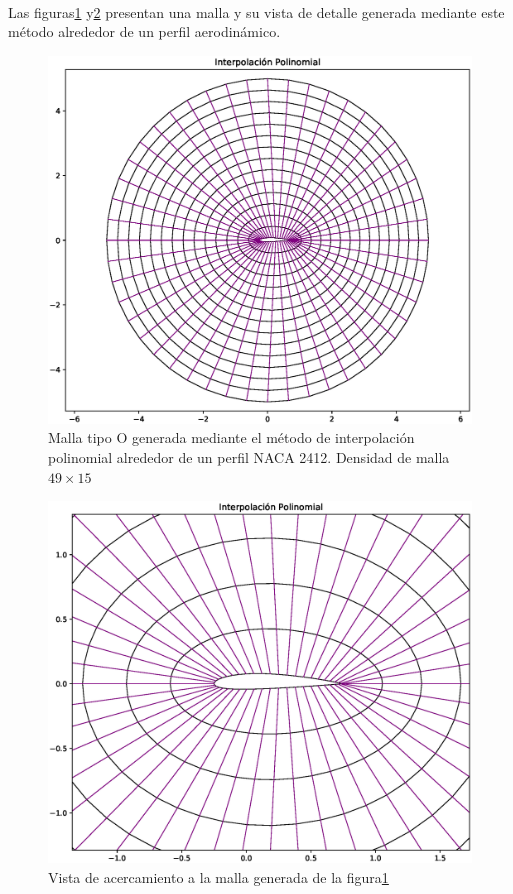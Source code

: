 \documentclass[letterpaper, openright, 12pt]{book}
\begin{document}
    \paragraph*{}
        Las figuras\ref{fig:malla-inter} y\ref{fig:malla-inter-cerca}
        presentan una malla y su vista de detalle generada mediante este método
        alrededor de un perfil aerodinámico.
        \begin{figure}[htbp!]
            \centering
            \includegraphics[width=120mm]{./Imagenes/M-inter_pol}
            \captionsetup{justification=centering, margin=2cm}
            \caption[Malla Interpolación Polinomial]{Malla tipo O generada
            mediante el método de interpolación polinomial alrededor de un
            perfil NACA 2412. Densidad de malla $49\times15$}
            \label{fig:malla-inter}
        \end{figure}
        \begin{figure}[htbp!]
            \centering
            \includegraphics[width=120mm]{./Imagenes/M-inter_pol_cerca}
            \captionsetup{justification=centering, margin=2cm}
            \caption[Malla Interpolación Polinomial Acercamiento]{Vista de
            acercamiento a la malla generada de la figura\ref{fig:malla-inter}}
            \label{fig:malla-inter-cerca}
        \end{figure}
\end{document}
